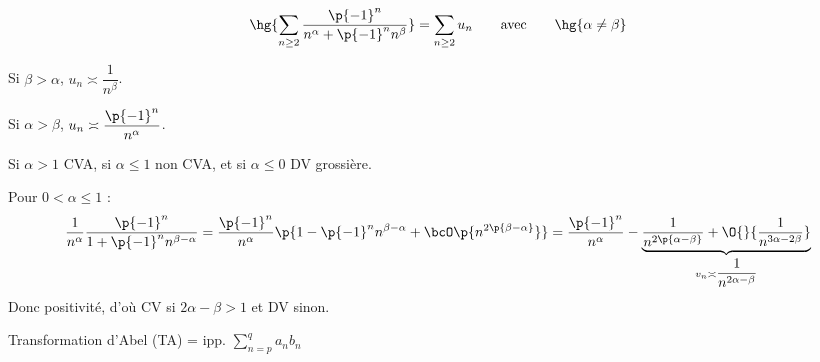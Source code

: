 \documentclass[a4paper,french,bookmarks]{book}
\begin{document}
    \begin{exercise}{}{}
        \[ \hg{\sum_{n \geq 2} \dfrac{\p{-1}^n}{n^\alpha + \p{-1}^nn^\beta}} = \sum_{n \geq 2} u_n \qquad\text{avec}\qquad \hg{\alpha \neq \beta}\]
        \begin{enumerate}
            \itt Si $\beta > \alpha$, $u_n \asymp \dfrac{1}{n^\beta}$.
            
            \itt Si $\alpha > \beta$, $u_n \asymp \dfrac{\p{-1}^n}{n^\alpha}$.
            
            Si $\alpha > 1$ CVA, si $\alpha \leq 1$ non CVA, et si $\alpha \leq 0$ DV grossière.
            
            Pour $0 < \alpha \leq 1$ :
            \[ \dfrac{1}{n^\alpha} \dfrac{\p{-1}^n}{1 + \p{-1}^nn^{\beta - \alpha}} = \dfrac{\p{-1}^n}{n^\alpha}\p{1 - \p{-1}^nn^{\beta- \alpha} + \bcO\p{n^{2\p{\beta- \alpha}}}} = \dfrac{\p{-1}^n}{n^\alpha} - \underbrace{\dfrac{1}{n^{2\p{\alpha - \beta}}} + \O{}{\dfrac{1}{n^{3\alpha - 2\beta}}}}_{v_n \asymp \dfrac{1}{n^{2\alpha - \beta}}}\]
            Donc positivité, d'où CV si $2\alpha - \beta > 1$ et DV sinon.
        \end{enumerate}
    \end{exercise}
    
    Transformation d'Abel (TA) = ipp. $\sum_{n=p}^q a_nb_n$
\end{document}
